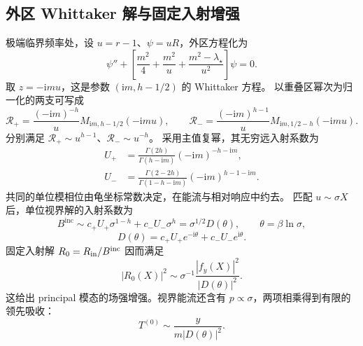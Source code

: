 \documentclass[UTF8,fontset=fandol,11pt,a4paper]{ctexart}
\newcommand{\ii}{\mathrm{i}}
\newcommand{\Bin}{B^{\mathrm{inc}}}
\numberwithin{equation}{section}
\begin{document}
\subsection{外区 Whittaker 解与固定入射增强}
极端临界频率处，设 $u=r-1$、$\psi=uR$，外区方程化为
\begin{equation}
\psi''+\left[\frac{m^2}{4}+\frac{m^2}{u}
+\frac{m^2-\lambda_\star}{u^2}\right]\psi=0.
\end{equation}
取 $z=-\ii mu$，这是参数 $(\ii m,h-1/2)$ 的 Whittaker 方程。
以重叠区幂次为归一化的两支可写成
\begin{equation}
\mathcal R_+=\frac{(-\ii m)^{-h}}u M_{\ii m,h-1/2}(-\ii mu),\qquad
\mathcal R_- =\frac{(-\ii m)^{h-1}}u M_{\ii m,1/2-h}(-\ii mu).
\end{equation}
分别满足 $\mathcal R_+\sim u^{h-1}$、$\mathcal R_-\sim u^{-h}$。
采用主值复幂，其无穷远入射系数为
\begin{align}
U_+&=\frac{\Gamma(2h)}{\Gamma(h-\ii m)}(-\ii m)^{-h-\ii m},\\
U_-&=\frac{\Gamma(2-2h)}{\Gamma(1-h-\ii m)}(-\ii m)^{h-1-\ii m}.
\end{align}
共同的单位模相位由龟坐标常数决定，在能流与相对响应中约去。
匹配 $u\sim\sigma X$ 后，单位视界解的入射系数为
\begin{equation}
\Bin\sim c_+U_+\sigma^{1-h}+c_-U_-\sigma^h
=\sigma^{1/2}D(\theta),\qquad \theta=\beta\ln\sigma,
\end{equation}
\begin{equation}
D(\theta)=c_+U_+e^{-\ii\theta}+c_-U_-e^{\ii\theta}.
\label{eq:principal-D-v2}
\end{equation}
固定入射解 $R_0=R_{\rm in}/\Bin$ 因而满足
\begin{equation}
|R_0(X)|^2\sim\sigma^{-1}\frac{|f_y(X)|^2}{|D(\theta)|^2}.
\end{equation}
这给出 principal 模态的场强增强。视界能流还含有 $p\propto\sigma$，两项相乘得到有限的领先吸收：
\begin{equation}
T^{(0)}\sim\frac{y}{m|D(\theta)|^2}.
\end{equation}
\end{document}
